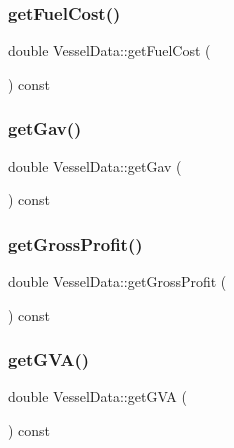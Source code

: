 \mbox{\label{class_vessel_data_a7ea9f153c87d0cda7d6c7b0a8585a765}} 
\subsubsection{\texorpdfstring{getFuelCost()}{getFuelCost()}}
{\footnotesize\ttfamily double Vessel\+Data\+::get\+Fuel\+Cost (\begin{DoxyParamCaption}{ }\end{DoxyParamCaption}) const}

\mbox{\label{class_vessel_data_a85d4e6ac3633ade768fc00d6497cee82}} 
\subsubsection{\texorpdfstring{getGav()}{getGav()}}
{\footnotesize\ttfamily double Vessel\+Data\+::get\+Gav (\begin{DoxyParamCaption}{ }\end{DoxyParamCaption}) const}

\mbox{\label{class_vessel_data_a2469bd71a4c49b09f50e5e96a3b4d983}} 
\subsubsection{\texorpdfstring{getGrossProfit()}{getGrossProfit()}}
{\footnotesize\ttfamily double Vessel\+Data\+::get\+Gross\+Profit (\begin{DoxyParamCaption}{ }\end{DoxyParamCaption}) const}

\mbox{\label{class_vessel_data_ae6043198db6a2a6207ac4c7094efd4ac}} 
\subsubsection{\texorpdfstring{getGVA()}{getGVA()}}
{\footnotesize\ttfamily double Vessel\+Data\+::get\+G\+VA (\begin{DoxyParamCaption}{ }\end{DoxyParamCaption}) const}

